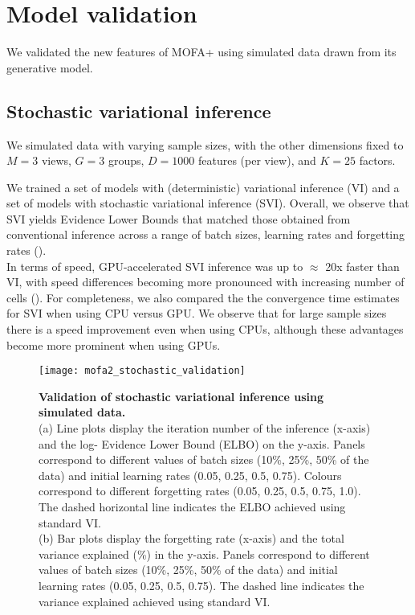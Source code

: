 \graphicspath{{Chapter4/Figs/simulations/}{Chapter4/Figs/scrna/}{Chapter4/Figs/scmet/}{Chapter4/Figs/scnmt/}}

\section{Model validation}

We validated the new features of MOFA+ using simulated data drawn from its generative model.

\subsection{Stochastic variational inference}

We simulated data with varying sample sizes, with the other dimensions fixed to $M=3$ views, $G=3$ groups, $D=1000$ features (per view), and $K=25$ factors.

We trained a set of models with (deterministic) variational inference (VI) and a set of models with stochastic variational inference (SVI). Overall, we observe that SVI yields Evidence Lower Bounds that matched those obtained from conventional inference across a range of batch sizes, learning rates and forgetting rates ().\\
In terms of speed, GPU-accelerated SVI inference was up to $\approx$ 20x faster than VI, with speed differences becoming more pronounced with increasing number of cells (). For completeness, we also compared the the convergence time estimates for SVI when using CPU versus GPU. We observe that for large sample sizes there is a speed improvement even when using CPUs, although these advantages become more prominent when using GPUs.

\begin{figure}[H]
	\centering
	\texttt{[image: mofa2\_stochastic\_validation]}
	\caption[]{
	\textbf{Validation of stochastic variational inference using simulated data.} \\
	(a) Line plots display the iteration number of the inference (x-axis) and the log- Evidence Lower Bound (ELBO) on the y-axis. Panels correspond to different values of batch sizes (10\%, 25\%, 50\% of the data) and initial learning rates (0.05, 0.25, 0.5, 0.75). Colours correspond to different forgetting rates (0.05, 0.25, 0.5, 0.75, 1.0). The dashed horizontal line indicates the ELBO achieved using standard VI. \\
	(b) Bar plots display the forgetting rate (x-axis) and the total variance explained (\%) in the y-axis. Panels correspond to different values of batch sizes (10\%, 25\%, 50\% of the data) and initial learning rates (0.05, 0.25, 0.5, 0.75). The dashed line indicates the variance explained achieved using standard VI. 
	}
	\label{fig:mofa2_stochastic_validation}
\end{figure}

